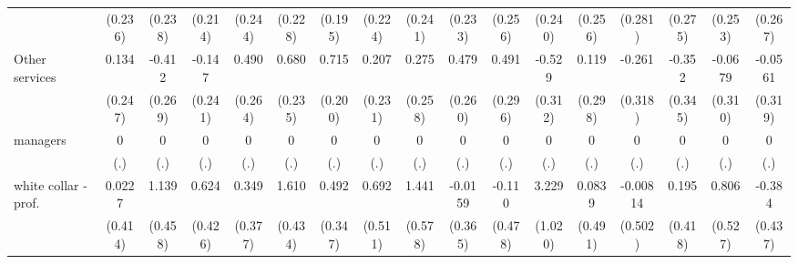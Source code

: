 {\begin{tabular}{l*{16}{c}}
                    &     (0.236)         &     (0.238)         &     (0.214)         &     (0.244)         &     (0.228)         &     (0.195)         &     (0.224)         &     (0.241)         &     (0.233)         &     (0.256)         &     (0.240)         &     (0.256)         &     (0.281)         &     (0.275)         &     (0.253)         &     (0.267)         \\
[1em]
Other services      &       0.134         &      -0.412         &      -0.147         &       0.490         &       0.680\sym{**} &       0.715\sym{***}&       0.207         &       0.275         &       0.479         &       0.491         &      -0.529         &       0.119         &      -0.261         &      -0.352         &     -0.0679         &     -0.0561         \\
                    &     (0.247)         &     (0.269)         &     (0.241)         &     (0.264)         &     (0.235)         &     (0.200)         &     (0.231)         &     (0.258)         &     (0.260)         &     (0.296)         &     (0.312)         &     (0.298)         &     (0.318)         &     (0.345)         &     (0.310)         &     (0.319)         \\
[1em]
managers            &           0         &           0         &           0         &           0         &           0         &           0         &           0         &           0         &           0         &           0         &           0         &           0         &           0         &           0         &           0         &           0         \\
                    &         (.)         &         (.)         &         (.)         &         (.)         &         (.)         &         (.)         &         (.)         &         (.)         &         (.)         &         (.)         &         (.)         &         (.)         &         (.)         &         (.)         &         (.)         &         (.)         \\
[1em]
white collar - prof.&      0.0227         &       1.139\sym{*}  &       0.624         &       0.349         &       1.610\sym{***}&       0.492         &       0.692         &       1.441\sym{*}  &     -0.0159         &      -0.110         &       3.229\sym{**} &      0.0839         &    -0.00814         &       0.195         &       0.806         &      -0.384         \\
                    &     (0.414)         &     (0.458)         &     (0.426)         &     (0.377)         &     (0.434)         &     (0.347)         &     (0.511)         &     (0.578)         &     (0.365)         &     (0.478)         &     (1.020)         &     (0.491)         &     (0.502)         &     (0.418)         &     (0.527)         &     (0.437)         \\

\end{tabular}}

